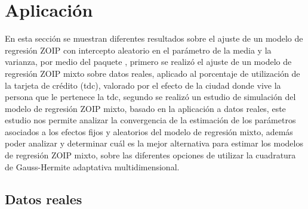 \section{Aplicaci\'{o}n}

En esta secci\'{o}n se muestran diferentes resultados sobre el ajuste de un modelo de regresi\'{o}n ZOIP con intercepto aleatorio en el par\'{a}metro de la media y la varianza, por medio del paquete , primero se realiz\'{o} el ajuste de un modelo de regresi\'{o}n ZOIP mixto sobre datos reales, aplicado al porcentaje de utilizaci\'{o}n de la tarjeta de cr\'{e}dito (tdc), valorado por el efecto de la ciudad donde vive la persona que le pertenece la tdc, segundo se realiz\'{o} un estudio de simulaci\'{o}n del modelo de regresi\'{o}n ZOIP mixto, basado en la aplicaci\'{o}n a datos reales, este estudio nos permite analizar la convergencia de la estimaci\'{o}n de los pa\-r\'{a}\-me\-tros asociados a los efectos fijos y aleatorios del modelo de regresi\'{o}n mixto, adem\'{a}s poder analizar y determinar cu\'{a}l es la mejor alternativa para estimar los modelos de regresi\'{o}n ZOIP mixto, sobre las diferentes opciones de utilizar la cuadratura de Gauss-Hermite adaptativa multidimensional.

\subsection{Datos reales}

